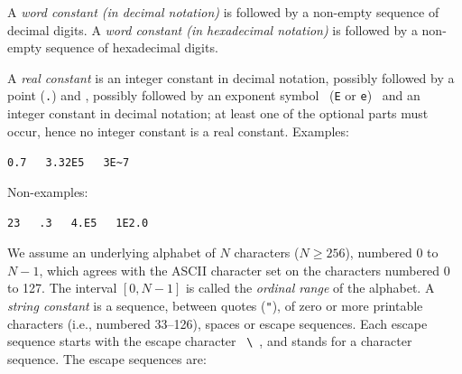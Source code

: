 A {\sl word constant (in decimal notation)} is   followed
by a non-empty sequence of decimal digits.
A {\sl word constant
(in hexadecimal notation)} is  followed by a non-empty
sequence of hexadecimal digits.

A {\sl real constant} is an integer constant in decimal notation,
possibly followed by a point ({\tt .}) and , possibly followed by an exponent symbol ~({\tt E} or {\tt e})~ and an integer
constant in decimal notation; at least one of the optional parts must occur, hence no integer
constant is a real constant.
Examples:
\begin{center}
  {\tt 0.7}~~~{\tt 3.32E5}~~~\verb(3E~7(~~~
\end{center}%
Non-examples:
\begin{center}
  {\tt 23}~~~{\tt .3}~~~{\tt 4.E5}~~~{\tt 1E2.0}~~~~~~
~~~
\end{center}%

We assume an underlying alphabet of $N$ characters ($N \geq 256$), numbered
$0$ to $N-1$, which agrees with the ASCII character set on the characters
numbered 0 to 127. The interval $[0, N-1]$ is called the {\sl ordinal range} of
the alphabet.
A {\sl string constant} is a sequence, between quotes ({\tt "}), of zero or
more printable characters (i.e., numbered 33--126), spaces or escape
sequences.
Each escape sequence starts with the
escape character ~\verb+\+~, and stands for a character sequence. The
escape sequences are:
\bigskip

